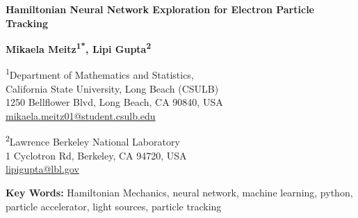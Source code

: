 \documentclass[11pt]{article}
\begin{document}



\begin{center}
  {\Large
    {\bf
    Hamiltonian Neural Network Exploration for Electron Particle Tracking
    }
  }
  
  \medskip
  
  {\bf
    Mikaela Meitz\textsuperscript{1*}, Lipi Gupta\textsuperscript{2}
  }
  
  \smallskip

  {
    \textsuperscript{1}Department of  Mathematics and Statistics, \\
    California State University, Long Beach (CSULB) \\
    1250 Bellflower Blvd, Long Beach, CA 90840, USA \\
    \href{mailto:mikaela.meitz01@student.csulb.edu}{mikaela.meitz01@student.csulb.edu} 
    
    
    \smallskip
    
    \textsuperscript{2}Lawrence Berkeley National Laboratory \\
    1 Cyclotron Rd, Berkeley, CA 94720, USA \\
    \href{mailto:lipigupta@lbl.gov}{lipigupta@lbl.gov}

  }
\end{center}

\medskip

{\bf Key Words:} Hamiltonian Mechanics, neural network, machine learning, python, particle accelerator, light sources, particle tracking 
\end{document}
